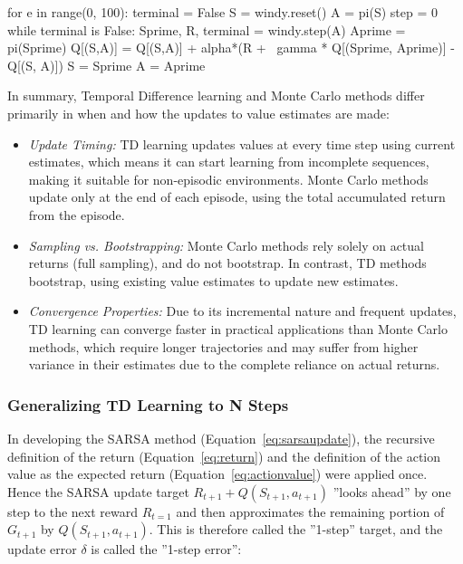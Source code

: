 \begin{samepage}
\begin{pythoncode}
for e in range(0, 100):
    terminal = False
    S = windy.reset()
    A = pi(S)
    step = 0
    while terminal is False:
        Sprime, R, terminal = windy.step(A)
        Aprime = pi(Sprime)
        Q[(S,A)] = Q[(S,A)] + alpha*(R + \
            gamma * Q[(Sprime, Aprime)] - Q[(S, A)])
        S = Sprime
        A = Aprime
\end{pythoncode}
\end{samepage}

In summary, Temporal Difference learning and Monte Carlo methods differ primarily in when and how the updates to value estimates are made:
\begin{itemize}
\item \emph{Update Timing:} TD learning updates values at every time step using current estimates, which means it can start learning from incomplete sequences, making it suitable for non-episodic environments. Monte Carlo methods update only at the end of each episode, using the total accumulated return from the episode.
\item \emph{Sampling vs. Bootstrapping:} Monte Carlo methods rely solely on actual returns (full sampling), and do not bootstrap. In contrast, TD methods bootstrap, using existing value estimates to update new estimates.
\item \emph{Convergence Properties:} Due to its incremental nature and frequent updates, TD learning can converge faster in practical applications than Monte Carlo methods, which require longer trajectories and may suffer from higher variance in their estimates due to the complete reliance on actual returns.
\end{itemize}

\subsubsection*{Generalizing TD Learning to N Steps}

In developing the SARSA method (Equation~\ref{eq:sarsaupdate}), the recursive definition of the return (Equation~\ref{eq:return}) and the definition of the action value as the expected return (Equation~\ref{eq:actionvalue}) were applied once. Hence the SARSA update target $R_{t+1} + Q(S_{t+1}, a_{t+1})$ ''looks ahead'' by one step to the next reward $R_{t=1}$ and then approximates the remaining portion of $G_{t+1}$ by $Q(S_{t+1}, a_{t+1})$. This is therefore called the ''1-step'' target, and the update error $\delta$ is called the ''1-step error'':

